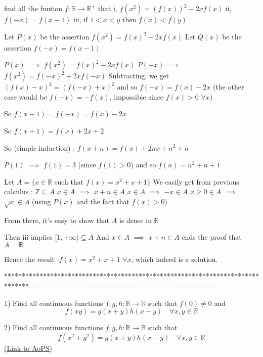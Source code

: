 \begin{solution}
	\begin{tcolorbox}find all the funtion $f:\mathbb{R} \to \mathbb{R^+}$ that 
i, $f(x^2)=(f(x))^2-2xf(x)$
ii, $f(-x)=f(x-1)$
iii, if $1<x<y$ then $f(x)<f(y)$\end{tcolorbox}
Let $P(x)$ be the assertion $f(x^2)=f(x)^2-2xf(x)$
Let $Q(x)$ be the assertion $f(-x)=f(x-1)$

$P(x)$ $\implies$ $f(x^2)=f(x)^2-2xf(x)$
$P(-x)$ $\implies$ $f(x^2)=f(-x)^2+2xf(-x)$
Subtracting, we get $(f(x)-x)^2=(f(-x)+x)^2$ and so $f(-x)=f(x)-2x$ (the other case would be $f(-x)=-f(x)$, impossible since $f(x)>0$ $\forall x$)

So $f(x-1)=f(-x)=f(x)-2x$

So $f(x+1)=f(x)+2x+2$

So (simple induction) : $f(x+n)=f(x)+2nx+n^2+n$

$P(1)$ $\implies$ $f(1)=3$ (since $f(1)>0$) and so $f(n)=n^2+n+1$

Let $A=\{x\in\mathbb R$ such that $f(x)=x^2+x+1\}$
We easily get from previous calculus :
$\mathbb Z\subseteq A$
$x\in A$ $\implies$ $x+n\in A$
$x\in A$ $\implies$ $-x\in A$
$x\ge 0\in A$ $\implies$ $\sqrt x\in A$ (using $P(x)$ and the fact that $f(x)>0$)

From there, it's easy to show that $A$ is dense in $\mathbb R$

Then iii implies $[1,+\infty)\subseteq A$
And $x\in A$ $\implies$ $x+n\in A$ ends the proof that $A=\mathbb R$

Hence the result :$\boxed{f(x)=x^2+x+1}$ $\forall x$, which indeed is a solution.
\end{solution}
*******************************************************************************
-------------------------------------------------------------------------------

\begin{problem}
	1) Find all continuous functions $f,g,h:\mathbb{R}\to\mathbb{R}$ such that $f(0)\neq 0$ and 
\[f(xy)=g(x+y)h(x-y) \quad \forall x,y\in\mathbb{R}\]

2) Find all continuous functions $f,g,h:\mathbb{R}\to\mathbb{R}$ such that 
\[f\left ( x^{2} +y^{2}\right )=g\left (x+y  \right )h\left ( x-y \right ) \quad \forall x,y\in\mathbb{R}\]
	\flushright \href{https://artofproblemsolving.com/community/c6h564898}{(Link to AoPS)}
\end{problem}



